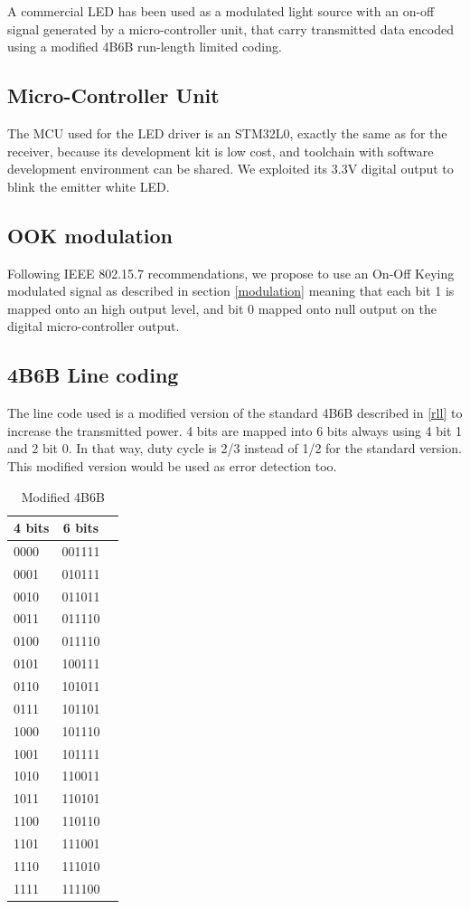 A commercial LED has been used as a modulated light source with an on-off signal generated by a micro-controller unit, that carry transmitted data encoded using a modified 4B6B run-length limited coding.

\subsection{Micro-Controller Unit}
The MCU used for the LED driver is an STM32L0, exactly the same as for the receiver, because its development kit is low cost, and toolchain with software development environment can be shared. We exploited its 3.3V digital output to blink the emitter white LED.

\subsection{OOK modulation}
Following IEEE 802.15.7 recommendations, we propose to use an On-Off Keying modulated signal as described in section \ref{modulation} meaning that each bit 1 is mapped onto an high output level, and bit 0 mapped onto null output on the digital micro-controller output. 

\subsection{4B6B Line coding}

The line code used is a modified version of the standard 4B6B described in \ref{rll} to increase the transmitted power.
4 bits are mapped into 6 bits always using 4 bit 1 and 2 bit 0. In that way, duty cycle is 2/3 instead of 1/2 for the standard version. This modified version would be used as error detection too.

\begin{table}[htbp]
\begin{center}
\begin{tabular}{|l|c|r|}
  \hline
  4 bits & 6 bits \\
  \hline
  0000 & 001111 \\
  0001 & 010111 \\
  0010 & 011011 \\
  0011 & 011110 \\
  0100 & 011110 \\
  0101 & 100111 \\
  0110 & 101011 \\
  0111 & 101101 \\
  1000 & 101110 \\
  1001 & 101111 \\
  1010 & 110011 \\
  1011 & 110101 \\
  1100 & 110110 \\
  1101 & 111001 \\
  1110 & 111010 \\
  1111 & 111100 \\
  \hline
\end{tabular}
\end{center}
\caption{Modified 4B6B}
\label{tab:m4b6b}
\end{table}


